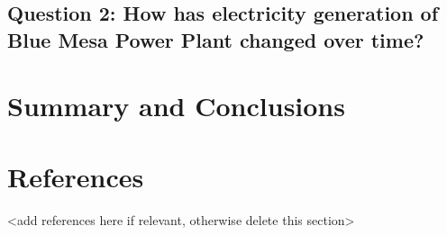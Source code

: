 \documentclass[
  12pt,
]{article}
\begin{document}
\hypertarget{question-2-how-has-electricity-generation-of-blue-mesa-power-plant-changed-over-time}{%
\subsection{Question 2: How has electricity generation of Blue Mesa
Power Plant changed over
time?}\label{question-2-how-has-electricity-generation-of-blue-mesa-power-plant-changed-over-time}}

\newpage

\hypertarget{summary-and-conclusions}{%
\section{Summary and Conclusions}\label{summary-and-conclusions}}

\newpage

\hypertarget{references}{%
\section{References}\label{references}}

\textless add references here if relevant, otherwise delete this
section\textgreater{}
\end{document}
